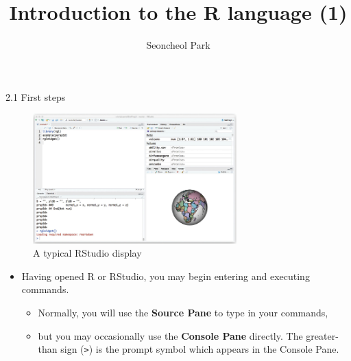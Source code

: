\documentclass[
  9pt,
  a4paper,
  ignorenonframetext,
  notheorems]{beamer}
\title{Introduction to the R language (1)}
\author{Seoncheol Park}
\date{}
\providecommand{\tightlist}{%
  \setlength{\itemsep}{0pt}\setlength{\parskip}{0pt}}\usepackage{longtable,booktabs,array}
\begin{document}
\frame{\titlepage}
\ifdefined\Shaded\renewenvironment{Shaded}{\begin{tcolorbox}[breakable, sharp corners, frame hidden, interior hidden, borderline west={3pt}{0pt}{shadecolor}, enhanced, boxrule=0pt]}{\end{tcolorbox}}\fi

\begin{frame}[fragile]{2.1 First steps}
\protect\hypertarget{first-steps}{}
\begin{figure}

{\centering \includegraphics[width=0.7\textwidth,height=\textheight]{images/intro-Rstudiopane.png}

}

\caption{A typical RStudio display}

\end{figure}

\begin{itemize}
\tightlist
\item
  Having opened R or RStudio, you may begin entering and executing
  commands.

  \begin{itemize}
  \tightlist
  \item
    Normally, you will use the \textbf{Source Pane} to type in your
    commands,
  \item
    but you may occasionally use the \textbf{Console Pane} directly. The
    greater-than sign (\texttt{\textgreater{}}) is the prompt symbol
    which appears in the Console Pane.
  \end{itemize}
\end{itemize}
\end{frame}
\end{document}
